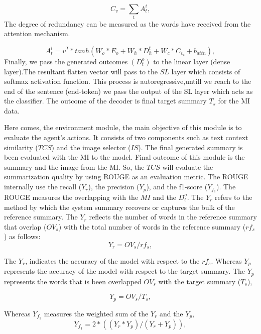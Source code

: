 \documentclass[preprint,review,12pt]{elsarticle}
\begin{document}
\begin{equation}
	C_v = \sum_{t} A^i_t, 
\end{equation}
The degree of redundancy can be measured as the words have received from the attention mechanism. 

\begin{equation}
	A^i_t = v^T * tanh(W_o*E_o + W_h*D_h^t+ W_c*C_{v_{t}} + b_{attn}),
\end{equation}
Finally, we pass the generated outcomes $(D^o_t)$ to the linear layer (dense layer).The resultant flatten vector will pass to the $SL$ layer which consists of softmax activation function. This process is autoregressive,untill we reach to the end of the sentence (end-token) we pass the output of the SL layer which acts as the classifier. The outcome of the decoder is final target summary $T_s$ for the MI data. 

Here comes, the environment module, the main objective of this module is to evaluate the agent's actions. It consists of two components such as text context similarity ($TCS$) and the image selector ($IS$). The final generated summary is been evaluated with the MI to the model. Final outcome of this module is the summary and the image from the MI. So, the $TCS$  will evaluate the summarization quality by using ROUGE as an evaluation metric. The ROUGE internally use the recall ($Y_r$), the precision ($Y_p$),  and the f1-score ($Y_{{f}_1}$). The ROUGE measures the overlapping with the $MI$ and the $D^o_t$. The $Y_r$ refers to the method by which the system summary recovers or captures the bulk of the reference summary. The $Y_r$ reflects the number of words in the reference summary that overlap ($OV_s$) with the total number of words in the reference summary ($rf_s$) as follows:
\begin{equation}
	Y_r = OV_s / rf_s ,
\end{equation}

The $Y_r$, indicates the accuracy of the model with respect to the $rf_s$. Whereas $Y_p$ represents the accuracy of the model with respect to the target summary. The $Y_p$ represents the  words that is been overlapped $OV_s$ with the target summary ($T_s$),

\begin{equation}
	Y_p = OV_s / T_s ,
\end{equation}

Whereas $Y_{{f}_1}$ measures the weighted sum of the $Y_r$ and the $Y_p$,
\begin{equation}
	Y_{{f}_1} = 2 * ((Y_r*Y_p)/(Y_r+Y_p)) ,
\end{equation}
\end{document}
